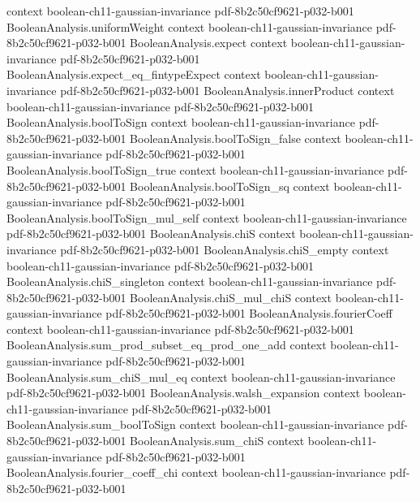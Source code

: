 \begin{lemma}
  {context}
  {boolean-ch11-gaussian-invariance}
  {pdf-8b2c50cf9621-p032-b001}
\proofstep
  {BooleanAnalysis.uniformWeight}
  {context}
  {boolean-ch11-gaussian-invariance}
  {pdf-8b2c50cf9621-p032-b001}
\proofstep
  {BooleanAnalysis.expect}
  {context}
  {boolean-ch11-gaussian-invariance}
  {pdf-8b2c50cf9621-p032-b001}
\proofstep
  {BooleanAnalysis.expect_eq_fintypeExpect}
  {context}
  {boolean-ch11-gaussian-invariance}
  {pdf-8b2c50cf9621-p032-b001}
\proofstep
  {BooleanAnalysis.innerProduct}
  {context}
  {boolean-ch11-gaussian-invariance}
  {pdf-8b2c50cf9621-p032-b001}
\proofstep
  {BooleanAnalysis.boolToSign}
  {context}
  {boolean-ch11-gaussian-invariance}
  {pdf-8b2c50cf9621-p032-b001}
\proofstep
  {BooleanAnalysis.boolToSign_false}
  {context}
  {boolean-ch11-gaussian-invariance}
  {pdf-8b2c50cf9621-p032-b001}
\proofstep
  {BooleanAnalysis.boolToSign_true}
  {context}
  {boolean-ch11-gaussian-invariance}
  {pdf-8b2c50cf9621-p032-b001}
\proofstep
  {BooleanAnalysis.boolToSign_sq}
  {context}
  {boolean-ch11-gaussian-invariance}
  {pdf-8b2c50cf9621-p032-b001}
\proofstep
  {BooleanAnalysis.boolToSign_mul_self}
  {context}
  {boolean-ch11-gaussian-invariance}
  {pdf-8b2c50cf9621-p032-b001}
\proofstep
  {BooleanAnalysis.chiS}
  {context}
  {boolean-ch11-gaussian-invariance}
  {pdf-8b2c50cf9621-p032-b001}
\proofstep
  {BooleanAnalysis.chiS_empty}
  {context}
  {boolean-ch11-gaussian-invariance}
  {pdf-8b2c50cf9621-p032-b001}
\proofstep
  {BooleanAnalysis.chiS_singleton}
  {context}
  {boolean-ch11-gaussian-invariance}
  {pdf-8b2c50cf9621-p032-b001}
\proofstep
  {BooleanAnalysis.chiS_mul_chiS}
  {context}
  {boolean-ch11-gaussian-invariance}
  {pdf-8b2c50cf9621-p032-b001}
\proofstep
  {BooleanAnalysis.fourierCoeff}
  {context}
  {boolean-ch11-gaussian-invariance}
  {pdf-8b2c50cf9621-p032-b001}
\proofstep
  {BooleanAnalysis.sum_prod_subset_eq_prod_one_add}
  {context}
  {boolean-ch11-gaussian-invariance}
  {pdf-8b2c50cf9621-p032-b001}
\proofstep
  {BooleanAnalysis.sum_chiS_mul_eq}
  {context}
  {boolean-ch11-gaussian-invariance}
  {pdf-8b2c50cf9621-p032-b001}
\proofstep
  {BooleanAnalysis.walsh_expansion}
  {context}
  {boolean-ch11-gaussian-invariance}
  {pdf-8b2c50cf9621-p032-b001}
\proofstep
  {BooleanAnalysis.sum_boolToSign}
  {context}
  {boolean-ch11-gaussian-invariance}
  {pdf-8b2c50cf9621-p032-b001}
\proofstep
  {BooleanAnalysis.sum_chiS}
  {context}
  {boolean-ch11-gaussian-invariance}
  {pdf-8b2c50cf9621-p032-b001}
\proofstep
  {BooleanAnalysis.fourier_coeff_chi}
  {context}
  {boolean-ch11-gaussian-invariance}
  {pdf-8b2c50cf9621-p032-b001}

\end{lemma}
